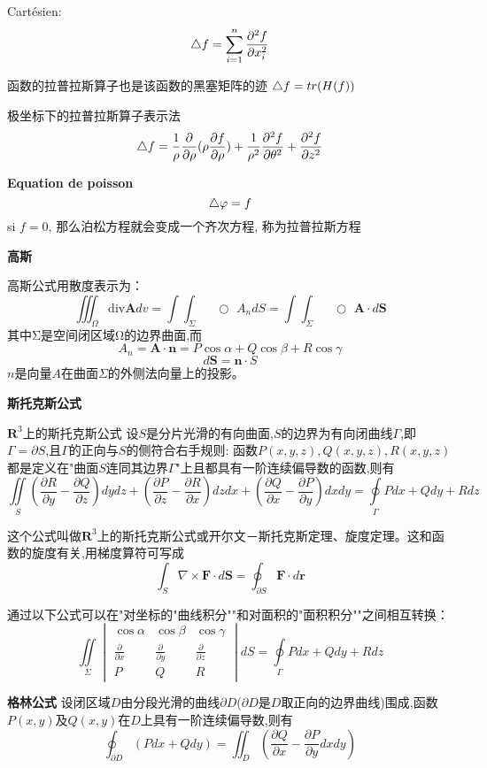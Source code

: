 \documentclass{book}
\begin{document}
Cart\'esien: $$\mathop{}\!\mathbin\bigtriangleup f = \sum_{i=1}^n \frac{\partial^2 f }{\partial x_i^2} $$

函数的拉普拉斯算子也是该函数的黑塞矩阵的迹 $\mathop{}\!\mathbin\bigtriangleup f = tr(H(f))$

极坐标下的拉普拉斯算子表示法
$$\mathop{}\!\mathbin\bigtriangleup f = \frac{ 1}{\rho}\frac{\partial  }{\partial \rho}(\rho \frac{\partial  f}{\partial \rho}) + \frac{ 1}{\rho^2}\frac{\partial ^2 f}{\partial\theta^2} + \frac{\partial^2 f}{\partial z^2}$$

\bigskip
\textbf{Equation de poisson}
$$\mathop{}\!\mathbin\bigtriangleup \varphi = f$$
si $f=0$, 那么泊松方程就会变成一个齐次方程, 称为拉普拉斯方程

\bigskip
\textbf{高斯}

高斯公式用散度表示为：
$$
\iiint_{\Omega}\mathrm{div}\mathbf{A}dv=
\int\!\!\!\!\int_{\Sigma}\!\!\!\!\!\!\!\!\!\!\!\!\!\!\;\;\;\bigcirc\,\,A_{n}dS
=
\int\!\!\!\!\int_{\Sigma}\!\!\!\!\!\!\!\!\!\!\!\!\!\!\;\;\;\bigcirc\,\,\mathbf{A}\cdot d\mathbf{S}
$$
其中Σ是空间闭区域Ω的边界曲面,而
$$
A_n=\mathbf{A}\cdot\mathbf{n}=P\cos\alpha+Q\cos\beta+R\cos\gamma
$$
$$
d\mathbf{S}=\mathbf{n}\cdot S
$$
$n$是向量$A$在曲面$\Sigma$的外侧法向量上的投影。

\bigskip
\textbf{斯托克斯公式}

$\mathbf{R}^3$上的斯托克斯公式
设$S$是分片光滑的有向曲面,$S$的边界为有向闭曲线$Γ$,即$\Gamma=\partial S$,且$Γ$的正向与$S$的侧符合右手规则: 函数$P(x,y,z),Q(x,y,z),R(x,y,z)$都是定义在"曲面$S$连同其边界$Γ$"上且都具有一阶连续偏导数的函数,则有
$$\iint\limits_{S}(\frac{\partial R}{\partial y}-\frac{\partial Q}{\partial z})dydz+(\frac{\partial P}{\partial z}-\frac{\partial R}{\partial x})dzdx+(\frac{\partial Q}{\partial x}-\frac{\partial P}{\partial y})dxdy
=\oint\limits_{\Gamma}Pdx+Qdy+Rdz$$

这个公式叫做$\mathbf{R}^3$上的斯托克斯公式或开尔文－斯托克斯定理、旋度定理。这和函数的旋度有关,用梯度算符可写成
$$
 \int_{S} \nabla \times \mathbf{F} \cdot d\mathbf{S} = \oint_{\partial S} \mathbf{F} \cdot d \mathbf{r}
$$

通过以下公式可以在"对坐标的"曲线积分""和对面积的"面积积分""之间相互转换：
$$
\iint\limits_{\Sigma}\begin{vmatrix} \cos \alpha & \cos \beta & \cos \gamma \\ \frac{\partial}{\partial x} & \frac{\partial}{\partial y} & \frac{\partial}{\partial z} \\ P & Q & R \end{vmatrix}dS=\oint\limits_{\Gamma}Pdx+Qdy+Rdz
$$

\bigskip
\textbf{格林公式}
设闭区域$D$由分段光滑的曲线$\partial D$($\partial D$是$D$取正向的边界曲线)围成,函数$P(x,y)$及$Q(x,y)$在$D$上具有一阶连续偏导数,则有
$$\oint_{\partial D} (Pdx+Qdy) = \iint_D (\frac{\partial Q}{\partial x} - \frac{\partial  P}{\partial y}dxdy)$$
\end{document}
